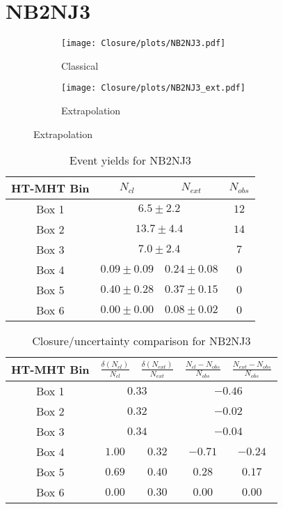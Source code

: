 \documentclass[11pt, oneside]{article}
\begin{document}
\clearpage


\section{NB2NJ3}

\begin{figure}[h]
\centering
\caption{NB2NJ3}
\begin{subfigure}[b]{0.49\textwidth}
\texttt{[image: Closure/plots/NB2NJ3.pdf]}
\caption{Classical}
\end{subfigure}
\begin{subfigure}[b]{0.49\textwidth}
\texttt{[image: Closure/plots/NB2NJ3\_ext.pdf]}
\caption{Extrapolation}
\end{subfigure}
\end{figure}


\begin{table}[h]
\centering
\caption{Event yields for NB2NJ3}
\begin{tabular}{|c|c|c|c|}
\hline
HT-MHT Bin & $N_{cl}$ & $N_{ext}$ & $N_{obs}$ \\
\hline
Box 1 & \multicolumn{2}{c|}{$6.5\pm2.2$} & $ 12$ \\ 
Box 2 & \multicolumn{2}{c|}{$13.7\pm4.4$} & $ 14$ \\ 
Box 3 & \multicolumn{2}{c|}{$7.0\pm2.4$} & $  7$ \\ 
\hline 
Box 4 & $0.09\pm0.09$ & $0.24\pm0.08$ & $  0$ \\ 
Box 5 & $0.40\pm0.28$ & $0.37\pm0.15$ & $  0$ \\ 
Box 6 & $0.00\pm0.00$ & $0.08\pm0.02$ & $  0$ \\ 
\hline
\end{tabular}
\end{table}


\begin{table}[h]
\centering
\caption{Closure/uncertainty comparison for NB2NJ3}
\begin{tabular}{|c|c|c|c|c|}
\hline
HT-MHT Bin & $\frac{\delta(N_{cl})}{N_{cl}}$ & $\frac{\delta(N_{ext})}{N_{ext}}$ & $\frac{N_{cl}-N_{obs}}{N_{obs}}$ &  $\frac{N_{ext}-N_{obs}}{N_{obs}}$ \\
\hline
Box 1 & \multicolumn{2}{c|}{$0.33$} & \multicolumn{2}{c|}{$-0.46$} \\ 
Box 2 & \multicolumn{2}{c|}{$0.32$} & \multicolumn{2}{c|}{$-0.02$} \\ 
Box 3 & \multicolumn{2}{c|}{$0.34$} & \multicolumn{2}{c|}{$-0.04$} \\ 
\hline 
Box 4 & $1.00$ & $0.32$ & $-0.71$ & $-0.24$ \\ 
Box 5 & $0.69$ & $0.40$ & $0.28$ & $0.17$ \\ 
Box 6 & $0.00$ & $0.30$ & $0.00$ & $0.00$ \\ 
\hline
\end{tabular}
\end{table}
\end{document}
